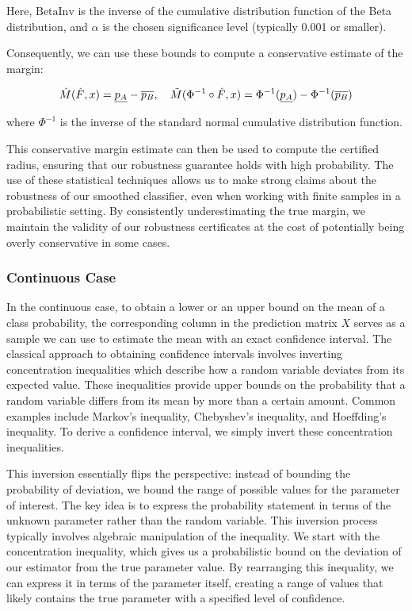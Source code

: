 Here, $\text{BetaInv}$ is the inverse of the cumulative distribution function of the Beta distribution, and $\alpha$ is the chosen significance level (typically 0.001 or smaller).

Consequently, we can use these bounds to compute a conservative estimate of the margin:

\begin{equation}
    \Hat{M}(\Hat{F},x)= \underline{p_A} - \overline{p_B}, \quad\tilde{M}(\Phi^{-1}\circ\Hat{F},x) = \Phi^{-1}(\underline{p_A}) - \Phi^{-1}(\overline{p_B})
\end{equation}

where $\Phi^{-1}$ is the inverse of the standard normal cumulative distribution function.

This conservative margin estimate can then be used to compute the certified radius, ensuring that our robustness guarantee holds with high probability.
The use of these statistical techniques allows us to make strong claims about the robustness of our smoothed classifier, even when working with finite samples in a probabilistic setting.
By consistently underestimating the true margin, we maintain the validity of our robustness certificates at the cost of potentially being overly conservative in some cases.

\subsubsection{Continuous Case}\label{subsubsec:continuous-case}
In the continuous case, to obtain a lower or an upper bound on the mean of a class probability, the corresponding column in the prediction matrix $X$ serves as a sample we can use to estimate the mean with an exact confidence interval.
The classical approach to obtaining confidence intervals involves inverting concentration inequalities which describe how a random variable deviates from its expected value.
These inequalities provide upper bounds on the probability that a random variable differs from its mean by more than a certain amount.
Common examples include Markov's inequality, Chebyshev's inequality, and Hoeffding's inequality.
To derive a confidence interval, we simply invert these concentration inequalities.

This inversion essentially flips the perspective: instead of bounding the probability of deviation, we bound the range of possible values for the parameter of interest.
The key idea is to express the probability statement in terms of the unknown parameter rather than the random variable.
This inversion process typically involves algebraic manipulation of the inequality.
We start with the concentration inequality, which gives us a probabilistic bound on the deviation of our estimator from the true parameter value.
By rearranging this inequality, we can express it in terms of the parameter itself, creating a range of values that likely contains the true parameter with a specified level of confidence.

